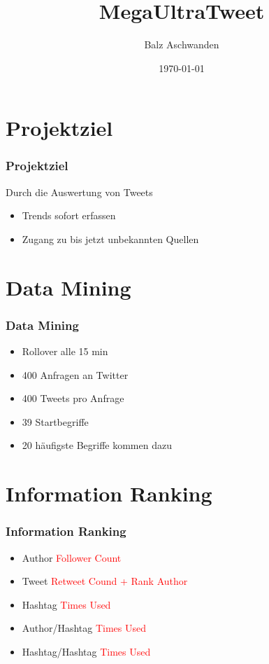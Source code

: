 \documentclass{beamer}
\title{MegaUltraTweet}
\author{Balz Aschwanden}
\date{\today}
\begin{document}
\frame{\titlepage} 

\section{Projektziel}
\begin{frame}
  \frametitle{Projektziel}
  Durch die Auswertung von Tweets \pause
  \begin{itemize}
    \item Trends sofort erfassen \pause
    \item Zugang zu bis jetzt unbekannten Quellen
  \end{itemize}
\end{frame}

\section{Data Mining}
\begin{frame}
  \frametitle{Data Mining} \pause
  \begin{itemize}
    \item Rollover alle 15 min \pause
    \item 400 Anfragen an Twitter \pause
    \item 400 Tweets pro Anfrage \pause
    \item 39 Startbegriffe \pause
    \item 20 häufigste Begriffe kommen dazu    
  \end{itemize}
\end{frame}

\section{Information Ranking}
\begin{frame}
  \frametitle{Information Ranking} \pause
  \begin{itemize}
    \item Author \pause \textcolor{red}{Follower Count} \pause
    \item Tweet \pause \textcolor{red}{Retweet Cound + Rank Author} \pause
    \item Hashtag \pause \textcolor{red}{Times Used} \pause
    \item Author/Hashtag \textcolor{red}{Times Used}
    \item Hashtag/Hashtag \textcolor{red}{Times Used}
  \end{itemize}
\end{frame}
\end{document}
